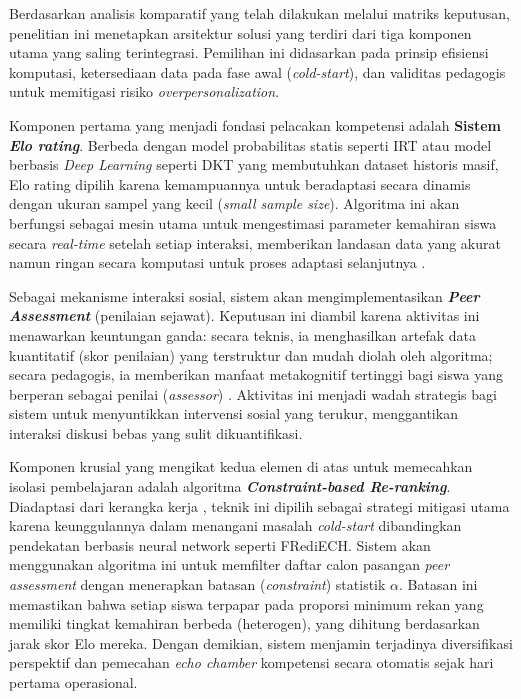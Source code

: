 Berdasarkan analisis komparatif yang telah dilakukan melalui matriks keputusan, penelitian ini menetapkan arsitektur solusi yang terdiri dari tiga komponen utama yang saling terintegrasi. Pemilihan ini didasarkan pada prinsip efisiensi komputasi, ketersediaan data pada fase awal (\textit{cold-start}), dan validitas pedagogis untuk memitigasi risiko \textit{overpersonalization}.

Komponen pertama yang menjadi fondasi pelacakan kompetensi adalah \textbf{Sistem \textit{Elo rating}}. Berbeda dengan model probabilitas statis seperti IRT atau model berbasis \textit{Deep Learning} seperti DKT yang membutuhkan dataset historis masif, Elo rating dipilih karena kemampuannya untuk beradaptasi secara dinamis dengan ukuran sampel yang kecil (\textit{small sample size}). Algoritma ini akan berfungsi sebagai mesin utama untuk mengestimasi parameter kemahiran siswa secara \textit{real-time} setelah setiap interaksi, memberikan landasan data yang akurat namun ringan secara komputasi untuk proses adaptasi selanjutnya \autocite{Vesin2022}.

Sebagai mekanisme interaksi sosial, sistem akan mengimplementasikan \textbf{\textit{Peer Assessment}} (penilaian sejawat). Keputusan ini diambil karena aktivitas ini menawarkan keuntungan ganda: secara teknis, ia menghasilkan artefak data kuantitatif (skor penilaian) yang terstruktur dan mudah diolah oleh algoritma; secara pedagogis, ia memberikan manfaat metakognitif tertinggi bagi siswa yang berperan sebagai penilai (\textit{assessor}) \autocite{Lu2012}. Aktivitas ini menjadi wadah strategis bagi sistem untuk menyuntikkan intervensi sosial yang terukur, menggantikan interaksi diskusi bebas yang sulit dikuantifikasi.

Komponen krusial yang mengikat kedua elemen di atas untuk memecahkan isolasi pembelajaran adalah algoritma \textbf{\textit{Constraint-based Re-ranking}}. Diadaptasi dari kerangka kerja \textcite{DeBiasio2023}, teknik ini dipilih sebagai strategi mitigasi utama karena keunggulannya dalam menangani masalah \textit{cold-start} dibandingkan pendekatan berbasis neural network seperti FRediECH. Sistem akan menggunakan algoritma ini untuk memfilter daftar calon pasangan \textit{peer assessment} dengan menerapkan batasan (\textit{constraint}) statistik $\alpha$. Batasan ini memastikan bahwa setiap siswa terpapar pada proporsi minimum rekan yang memiliki tingkat kemahiran berbeda (heterogen), yang dihitung berdasarkan jarak skor Elo mereka. Dengan demikian, sistem menjamin terjadinya diversifikasi perspektif dan pemecahan \textit{echo chamber} kompetensi secara otomatis sejak hari pertama operasional.

